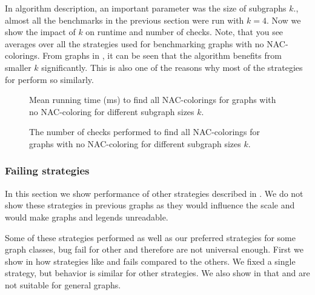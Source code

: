 In \Subgraphs{} algorithm description, an important parameter was the size of subgraphs \( k \).,
almost all the benchmarks in the previous section were run with \( k = 4 \).
Now we show the impact of	\( k \) on runtime and number of checks.
Note, that you see averages over all the strategies used for benchmarking
graphs with no NAC-colorings.
From graphs in ,
it can be seen that the algorithm benefits from smaller \( k \) significantly.
This is also one of the reasons why most of
the strategies for \Subgraphs{} perform so similarly.

\begin{figure}[p]
	\centering
	\scalebox{0.5}{}
	\caption[Mean runtime for graphs with no NAC-coloring (some).]{
		Mean running time (ms) to find all NAC-colorings for graphs with no NAC-coloring for different subgraph sizes \( k \).}%
	\label{fig:graph_no_nac_coloring_first_runtime_subgraph_size}
\end{figure}
\begin{figure}[p]
	\centering
	\scalebox{0.5}{}
	\caption[Checks performed for graphs with no NAC-coloring (some).]{
		The number of checks performed to find all NAC-colorings for graphs with no NAC-coloring for different subgraph sizes \( k \).}%
	\label{fig:graph_no_nac_coloring_first_checks_subgraph_size}
\end{figure}



\subsubsection{Failing strategies}%
\label{sec:failing_strategies}

In this section we show performance of other strategies described in .
We do not show these strategies in previous graphs as they would influence
the scale and would make graphs and legends unreadable.

Some of these strategies performed as well as our preferred strategies for some graph classes,
bug fail for other and therefore are not universal enough.
First we show in 
how strategies like \Log{} and \PromisingCycles{} fails compared to the others.
We fixed a single strategy, but behavior is similar for other strategies.
We also show in 
that \KernighanLin{} and \Cuts{} are not suitable for general graphs.

